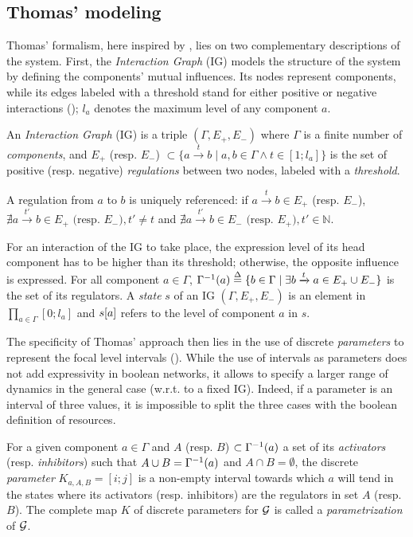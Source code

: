 \subsection{Thomas' modeling}
Thomas' formalism, here inspired by \cite{Richard06,BernotSemBRN}, lies on two complementary descriptions of the system.
First, the \emph{Interaction Graph} (IG) models the structure of the system by defining the components' mutual influences.
Its nodes represent components, while its edges labeled with a threshold stand for either positive or negative interactions ();
$l_a$ denotes the maximum level of any component $a$.

\begin{definition}
\label{def:ig}
An \emph{Interaction Graph} (IG) is a triple $(\Gamma, E_+, E_-)$ where $\Gamma$ is a finite number of \emph{components},
and $E_+$ (resp. $E_-$) $\subset \{a \xrightarrow{t} b \mid a, b \in \Gamma \wedge t \in [1; l_a]\}$
is the set of positive (resp. negative) \emph{regulations} between two nodes, labeled with a \emph{threshold}.

A regulation from $a$ to $b$ is uniquely referenced:
if $a \xrightarrow{t} b \in E_+$ (resp. $E_-$),
$\nexists a \xrightarrow{t'} b \in E_+ \text{ (resp. $E_-$)}, t' \neq t$
and $\nexists a \xrightarrow{t'} b \in E_-\text{ (resp. $E_+$)}, t' \in \mathbb{N}$.
\end{definition}

\noindent
For an interaction of the IG to take place, the expression level of its head component has to be higher than its threshold; otherwise, the opposite influence is expressed.
For all component $a \in \Gamma$, $\Gamma^{-1}(a) \stackrel{\Delta}= \{ b\in\Gamma\mid \exists b\xrightarrow t a\in E_+\cup E_- \}$
is the set of its regulators.
A \emph{state} $s$ of an IG $(\Gamma, E_+, E_-)$ is an element in $\prod_{a \in \Gamma} [0;l_a]$
and ${s[a]}$ refers to the level of component $a$ in $s$.

The specificity of Thomas' approach then lies in the use of discrete \emph{parameters} to represent the focal level intervals ().
While the use of intervals as parameters does not add expressivity in boolean networks, it allows to specify a larger range of dynamics in the general case (w.r.t. to a fixed IG).
Indeed, if a parameter is an interval of three values, it is impossible to split the three cases with the boolean definition of resources.

\begin{definition}\label{def:param}
For a given component $a \in \Gamma$ and $A$ (resp. $B$) $\subset \Gamma^{-1}(a)$ a set of its \emph{activators} (resp. \emph{inhibitors}) such that $A \cup B = \Gamma^{-1}(a)$ and $A \cap B = \emptyset$,
the discrete \emph{parameter} $K_{a,A,B} = [i; j]$ is a non-empty interval towards which $a$ will tend
in the states where its activators (resp. inhibitors) are the regulators in set $A$ (resp. $B$).
The complete map $K$ of discrete parameters for $\mathcal{G}$ is called a \emph{parametrization} of $\mathcal{G}$.
\end{definition}

